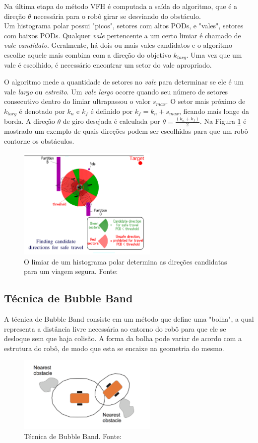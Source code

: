 Na última etapa do método VFH é computada a saída do algoritmo, que é a direção $\theta$ necessária para o robô girar se desviando do obstáculo.
\\

Um histograma polar possui "picos", setores com altos PODs,  e "vales", setores com baixos PODs. Qualquer \textit{vale} pertencente a um certo limiar é chamado de \textit{vale candidato}. Geralmente, há dois ou mais vales candidatos e o algoritmo escolhe aquele mais combina com a direção do objetivo $k_{targ}$.	 Uma vez que um vale é escolhido, é necessário encontrar um setor do vale apropriado.

O algoritmo mede a quantidade de setores no \textit{vale} para determinar se ele é um vale \textit{largo} ou \textit{estreito}. Um \textit{vale largo} ocorre quando seu número de setores consecutivo dentro do limiar ultrapassou o valor $s_{max}$. O setor mais próximo de $k_{targ}$ é denotado por $k_{n}$ e $k_{f}$ é definido por $k_{f} = k_{n}+s_{max}$, ficando mais longe da borda. A direção $\theta$ de giro desejada é calculada por $\theta = \frac{(k_{n} + k_{f})}{2}$. Na Figura \ref{fig:cand_direc} é mostrado um exemplo de quais direções podem ser escolhidas para que um robô contorne os obstáculos. 

\begin{figure}[H]
    \centering
    \includegraphics[width=0.6\textwidth]{img/candidate_directions}
    \caption{O limiar de um histograma polar determina as direções candidatas para um viagem segura. Fonte: \cite{c1}}
    \label{fig:cand_direc}
\end{figure}

\subsection{Técnica de Bubble Band}
\label{sec:bubbleband}

A técnica de Bubble Band \cite{c3} consiste em um método que define uma "bolha", a qual representa a distância livre necessária ao entorno do robô para que ele se desloque sem que haja colisão. A forma da bolha pode variar de acordo com a estrutura do robô, de modo que esta se encaixe na geometria do mesmo.

\begin{figure}[H]
    \centering
    \includegraphics[width=0.6\textwidth]{img/bubble}
    \caption{Técnica de Bubble Band. Fonte: \cite{c2}}
    \label{fig:bubble}
\end{figure}
